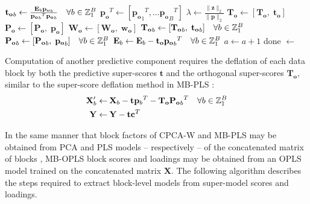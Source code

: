 \begin{algorithm}[H]
\begin{algorithmic}[1]
  \STATE $\mathbf{t_o}_b \gets
          \tfrac{\mathbf{E}_b \mathbf{p_o}_b}
                {{\mathbf{p_o}_b}^T \mathbf{p_o}_b}
          \quad \forall b \in \mathbb{Z}_{1}^{B}$
  \STATE $\mathbf{p_o}^T \gets [{\mathbf{p_o}_1}^T, \dots {\mathbf{p_o}_B}^T]$
  \STATE $\lambda \gets \tfrac{\| \mathbf{z} \|_2}{\| \mathbf{p} \|_2}$
    \STATE $\mathbf{T_o} \gets [\mathbf{T_o}, \; \mathbf{t_o}]$
    \STATE $\mathbf{P_o} \gets [\mathbf{P_o}, \; \mathbf{p_o}]$
    \STATE $\mathbf{W_o} \gets [\mathbf{W_o}, \; \mathbf{w_o}]$
    \STATE $\mathbf{T_o}_b \gets [\mathbf{T_o}_b, \; \mathbf{t_o}_b]
            \quad \forall b \in \mathbb{Z}_{1}^{B}$
    \STATE $\mathbf{P_o}_b \gets [\mathbf{P_o}_b, \; \mathbf{p_o}_b]
            \quad \forall b \in \mathbb{Z}_{1}^{B}$
    \STATE $\mathbf{E}_b \gets \mathbf{E}_b - \mathbf{t_o} {\mathbf{p_o}_b}^T
            \quad \forall b \in \mathbb{Z}_{1}^{B}$
    \STATE $a \gets a + 1$
  \ELSE
    \STATE done $\gets$ \TRUE
  \ENDIF
\ENDWHILE
\end{algorithmic}
\end{algorithm}
\newpage

\begin{doublespace}
Computation of another predictive component requires the deflation of each
data block by both the predictive super-scores $\mathbf{t}$ and the
orthogonal super-scores $\mathbf{T_o}$, similar to the super-score deflation
method in MB-PLS \cite{westerhuis:jchemo1997}:
\begin{align}
\mathbf{X}_b' \gets& \: \mathbf{X}_b -
 \mathbf{t} {\mathbf{p}_b}^T -
 \mathbf{T_o} {\mathbf{P_o}_b}^T
 \quad \forall b \in \mathbb{Z}_{1}^{B} \\
\mathbf{Y} \gets& \: \mathbf{Y} - \mathbf{t} \mathbf{c}^T
\end{align}

In the same manner that block factors of CPCA-W and MB-PLS may be obtained from
PCA and PLS models -- respectively -- of the concatenated matrix of blocks
\cite{westerhuis:jchemo1998,smilde:jchemo2003}, MB-OPLS block scores and
loadings may be obtained from an OPLS model trained on the concatenated
matrix $\mathbf{X}$. The following algorithm describes the steps required
to extract block-level models from super-model scores and loadings.
\end{doublespace}

